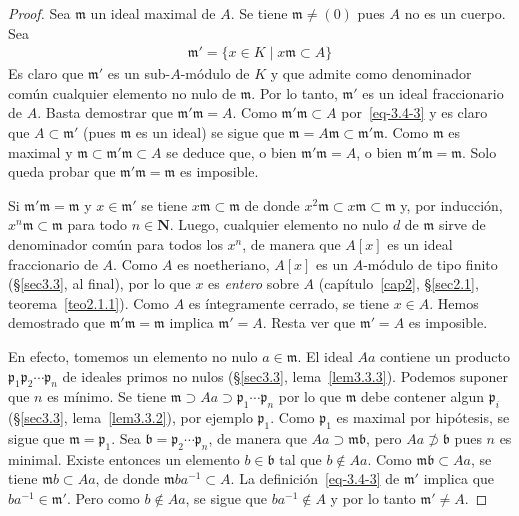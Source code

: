 \documentclass[oneside,bibtotoc,leqno,spanish]{amsbook}
\newcommand{\NN}{\mathbf{N}}
\newcommand{\idl}[1]{\mathfrak{#1}}
\newcommand{\QED}{}%
\numberwithin{equation}{section}
\theoremstyle{defi}
\theoremstyle{note}
\theoremstyle{rem}
\numberwithin{theorem}{section}
\numberwithin{proposition}{section}
\numberwithin{definition}{section}
\numberwithin{lemma}{section}
\numberwithin{corollary}{section}
\numberwithin{example}{section}
\numberwithin{footnote}{section}%
\begin{document}
\begin{proof}
Sea $\idl{m}$ un ideal maximal de $A$. Se tiene $\idl{m}\neq(0)$ pues $A$ no es un cuerpo. Sea
\begin{gather}\label{eq-3.4-3}
\idl{m}' = \{x\in K\mid x\idl{m}\subset A\}
\end{gather}
Es claro que $\idl{m}'$ es un sub-$A$-m\'odulo de $K$ y que admite como denominador com\'un cualquier
elemento no nulo de $\idl{m}$. Por lo tanto, $\idl{m}'$ es un ideal fraccionario de $A$. Basta
demostrar que $\idl{m'}\idl{m} = A$.  Como $\idl{m}'\idl{m}\subset A$ por~\eqref{eq-3.4-3} y es claro que
$A\subset\idl{m}'$ (pues $\idl{m}$ es un ideal) se sigue que $\idl{m}=A\idl{m}\subset\idl{m'}\idl{m}$.
Como $\idl{m}$ es maximal y $\idl{m}\subset\idl{m'}\idl{m}\subset A$ se deduce que, o bien $\idl{m'}\idl{m} = A$,
o bien $\idl{m}'\idl{m} = \idl{m}$. Solo queda probar que $\idl{m}'\idl{m}=\idl{m}$ es imposible.

Si $\idl{m}'\idl{m} = \idl{m}$ y $x\in\idl{m}'$ se tiene $x\idl{m}\subset\idl{m}$ de donde $x^{2}\idl{m}\subset
x\idl{m}\subset\idl{m}$ y, por inducci\'on, $x^{n}\idl{m}\subset\idl{m}$ para todo $n\in\NN$. Luego, cualquier
elemento no nulo $d$ de $\idl{m}$ sirve de denominador com\'un para todos los $x^{n}$, de manera que
$A[x]$ es un ideal fraccionario de $A$. Como $A$ es noetheriano, $A[x]$ es un $A$-m\'odulo de tipo finito
(\S\ref{sec3.3}, al final), por lo que $x$ es {\em entero} sobre $A$ (cap\'itulo~\ref{cap2}, \S\ref{sec2.1}, teorema~\ref{teo2.1.1}).
Como $A$ es \'integramente
cerrado, se tiene $x\in A$. Hemos demostrado que $\idl{m}'\idl{m}=\idl{m}$ implica $\idl{m}'=A$. Resta ver que
$\idl{m}'=A$ es imposible.

En efecto, tomemos un elemento no nulo $a\in\idl{m}$. El ideal $Aa$ contiene un producto
$\idl{p}_{1}\idl{p}_{2}\cdots\idl{p}_{n}$ de ideales primos no nulos (\S\ref{sec3.3}, lema~\ref{lem3.3.3}). Podemos suponer que $n$
es m\'inimo. Se tiene $\idl{m}\supset Aa\supset\idl{p}_{1}\cdots\idl{p}_{n}$ por lo que $\idl{m}$ debe
contener algun $\idl{p}_{i}$ (\S\ref{sec3.3}, lema~\ref{lem3.3.2}), por ejemplo $\idl{p}_{1}$. Como $\idl{p}_{1}$ es maximal por
hip\'otesis, se sigue que $\idl{m} = \idl{p}_{1}$. Sea $\idl{b} = \idl{p}_{2}\cdots\idl{p}_{n}$, de manera
que $Aa\supset\idl{m}\idl{b}$, pero $Aa\not\supset\idl{b}$ pues $n$ es minimal. Existe entonces un elemento
$b\in\idl{b}$ tal que $b\notin Aa$. Como $\idl{m}\idl{b}\subset Aa$, se tiene $\idl{m}b\subset Aa$, de donde
$\idl{m}ba^{-1}\subset A$. La definici\'on~\eqref{eq-3.4-3} de $\idl{m}'$ implica que $ba^{-1}\in\idl{m}'$. Pero como
$b\notin Aa$, se sigue que $ba^{-1}\notin A$ y por lo tanto $\idl{m}'\neq A$. \QED
\end{proof}
\end{document}
